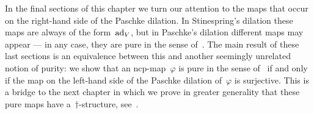 \documentclass[b]{subfiles}
\begin{document}
\begin{parsec}
\begin{point}
\begin{point}
In the final sections of this chapter we turn our attention to the maps
    that occur on the right-hand side of the Paschke dilation.
In Stinespring's dilation these maps are always of the form~$\mathrm{ad}_V$,
    but in Paschke's dilation different maps may appear ---
    in any case, they are pure in the sense of~.
The main result of these last sections
    is an equivalence between this and another
    seemingly unrelated notion of purity:
    we show that an ncp-map~$\varphi$ is pure in the sense of~
    if and only if the map on the left-hand side of
    the Paschke dilation of~$\varphi$ is surjective.
This is a bridge to the next chapter
    in which we prove in greater generality
    that these pure maps have a~$\dagger$-structure,
    see~.
\end{point}
\end{point}
\end{parsec}
\end{document}

